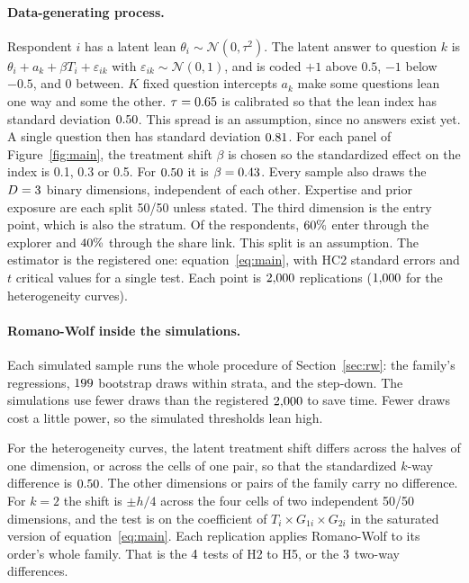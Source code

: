 \documentclass[11pt]{article}
\begin{document}
\paragraph{Data-generating process.} Respondent $i$ has a latent lean $\theta_i \sim
\mathcal{N}(0, \tau^2)$. The latent answer to question $k$ is $\theta_i + a_k + \beta T_i +
\varepsilon_{ik}$ with $\varepsilon_{ik} \sim \mathcal{N}(0, 1)$, and is coded $+1$ above $0.5$,
$-1$ below $-0.5$, and $0$ between. $K$ fixed question intercepts $a_k$ make some questions lean
one way and some the other. $\tau = 0.65$ is calibrated so that the lean index has standard
deviation $0.50$. This spread is an assumption, since no answers exist yet. A single question then has standard
deviation $0.81$. For each panel of Figure~\ref{fig:main}, the treatment shift $\beta$ is chosen so
the standardized effect on the index is 0.1, 0.3 or 0.5. For $0.50$ it is $\beta = 0.43$. Every sample also draws the $D = 3$ binary
dimensions, independent of each other. Expertise and prior exposure are each split 50/50 unless
stated. The third dimension is the entry point, which is also the stratum. Of the respondents,
$60\%$ enter through the explorer and $40\%$ through the share link. This split is an
assumption. The
estimator is the registered one: equation~\eqref{eq:main}, with HC2 standard errors and $t$
critical values for a single test. Each point is $2{,}000$ replications ($1{,}000$ for the
heterogeneity curves).

\paragraph{Romano-Wolf inside the simulations.} Each simulated sample runs the whole procedure of
Section~\ref{sec:rw}: the family's regressions, $199$ bootstrap draws within strata, and the
step-down. The simulations use fewer draws than the registered $2{,}000$ to save time. Fewer draws
cost a little power, so the simulated thresholds lean high.

For the heterogeneity curves, the latent treatment shift differs across the halves of one
dimension, or across the cells of one pair, so that the standardized $k$-way difference is
$0.50$. The other dimensions or pairs of the family carry no difference. For $k = 2$ the shift
is $\pm h/4$ across the four cells of two independent 50/50 dimensions, and the test is on the
coefficient of $T_i \times G_{1i} \times G_{2i}$ in the saturated version of
equation~\eqref{eq:main}. Each replication applies Romano-Wolf to its order's whole family. That
is the $4$ tests of H2 to H5, or the $3$ two-way differences.
\end{document}
